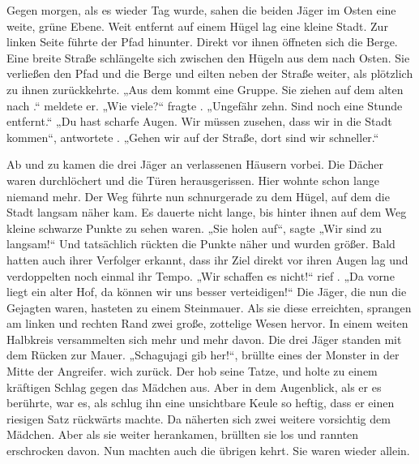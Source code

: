 \begin{huge}
Gegen morgen, als es wieder Tag wurde, sahen die beiden Jäger im Osten eine weite, grüne Ebene. Weit entfernt auf einem Hügel lag eine kleine Stadt. Zur linken Seite führte der Pfad hinunter. Direkt vor ihnen öffneten sich die Berge. Eine breite Straße schlängelte sich zwischen den Hügeln aus dem \Enland nach Osten. Sie verließen den Pfad und die Berge und eilten neben der Straße weiter, als \Dolo plötzlich zu ihnen zurückkehrte. „Aus dem \Enland kommt eine Gruppe. Sie ziehen auf dem alten  nach \Lobarn.“ meldete er. „Wie viele?“ fragte \Eno. „Ungefähr zehn. Sind noch eine Stunde entfernt.“ „Du hast scharfe Augen. Wir müssen zusehen, dass wir in die Stadt kommen“, antwortete \Eno. „Gehen wir auf der Straße, dort sind wir schneller.“

Ab und zu kamen die drei Jäger an verlassenen Häusern vorbei. Die Dächer waren durchlöchert und die Türen herausgerissen. Hier wohnte schon lange niemand mehr. Der Weg führte nun schnurgerade zu dem Hügel, auf dem die Stadt langsam näher kam. Es dauerte nicht lange, bis hinter ihnen auf dem Weg kleine schwarze Punkte zu sehen waren. „Sie holen auf“, sagte \Dolo{,} „Wir sind zu langsam!“ Und tatsächlich rückten die Punkte näher und wurden größer. Bald hatten auch ihrer Verfolger erkannt, dass ihr Ziel direkt vor ihren Augen lag und verdoppelten noch einmal ihr Tempo. „Wir schaffen es nicht!“ rief \Bomar. „Da vorne liegt ein alter Hof, da können wir uns besser verteidigen!“ Die Jäger, die nun die Gejagten waren, hasteten zu einem Steinmauer. Als sie diese erreichten, sprangen am linken und rechten Rand zwei große, zottelige Wesen hervor. In einem weiten Halbkreis versammelten sich mehr und mehr davon. Die drei Jäger standen mit dem Rücken zur Mauer. „Schagujagi gib her!“, brüllte eines der Monster in der Mitte der Angreifer. \Eno wich zurück. Der \Bangiri hob seine Tatze, und holte zu einem kräftigen Schlag gegen das Mädchen aus. Aber in dem Augenblick, als er es berührte, war es, als schlug ihn eine unsichtbare Keule so heftig, dass er einen riesigen Satz rückwärts machte. Da näherten sich zwei weitere \Bangiri vorsichtig dem Mädchen. Aber als sie weiter herankamen, brüllten sie los und rannten erschrocken davon. Nun machten auch die übrigen \Bangiri kehrt. Sie waren wieder allein.


\end{huge}
